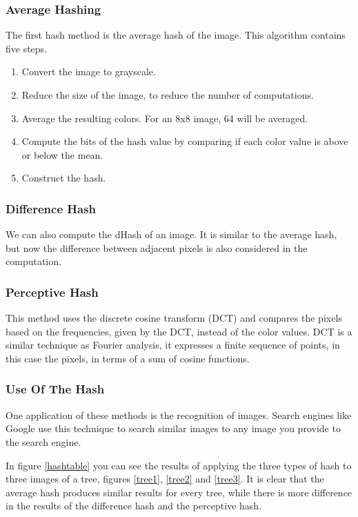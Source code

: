 \documentclass[12pt]{article}
\begin{document}
\subsubsection{Average Hashing}
The first hash method is the average hash of the image. This algorithm contains five steps.

\begin{enumerate}
        \item Convert the image to grayscale. 
        \item Reduce the size of the image, to reduce the number of computations.
        \item Average the resulting colors. For an 8x8 image, 64 will be averaged.
        \item Compute the bits of the hash value by comparing if each color value is above or below the mean.
        \item Construct the hash.
\end{enumerate}

\subsubsection{Difference Hash}
We can also compute the dHash of an image. It is similar to the average hash, but now the difference between adjacent pixels is also considered in the computation.

\subsubsection{Perceptive Hash}
This method uses the discrete cosine transform (DCT) and compares the pixels based on the frequencies, given by the DCT, instead of the color values.
DCT is a similar technique as Fourier analysis, it expresses a finite sequence of points, in this case the pixels, in terms of a sum of cosine functions.

\subsubsection{Use Of The Hash}
One application of these methods is the recognition of images. Search engines like Google use this technique to search similar images to any image you provide to the search engine.
\newline

In figure \ref{hashtable} you can see the results of applying the three types of hash to three images of a tree, figures \ref{tree1}, \ref{tree2} and \ref{tree3}. It is clear that the average hash produces similar results for every tree, while there is more difference in the results of the difference hash and the perceptive hash.
\end{document}
